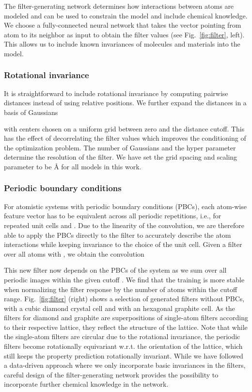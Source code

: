\documentclass[aip,jcp,reprint,graphicx]{revtex4-1}
\newcommand{\new}[1]{#1}
\begin{document}
The filter-generating network determines how interactions between atoms are modeled and can be used to constrain the model and include chemical knowledge.
We choose a fully-connected neural network that takes the vector pointing from atom  to its neighbor  as input to obtain the filter values  (see Fig.~\ref{fig:filter}, left).
This allows us to include known invariances of molecules and materials into the model.

\subsubsection{Rotational invariance}
It is straightforward to include rotational invariance by computing pairwise distances instead of using relative positions.
We further expand the distances in a basis of Gaussians

with centers  chosen on a uniform grid between zero and the distance cutoff.
This has the effect of decorrelating the filter values which improves the conditioning of the optimization problem.
The number of Gaussians and the hyper parameter  determine the resolution of the filter.
\new{We have set the grid spacing and scaling parameter  to be {\AA} for all models in this work.}

\subsubsection{Periodic boundary conditions}
For atomistic systems with periodic boundary conditions (PBCs), each atom-wise feature vector  has to be equivalent across all periodic repetitions, i.e.,  for repeated unit cells  and .
Due to the linearity of the convolution, we are therefore able to apply the PBCs directly to the filter to accurately describe the atom interactions while keeping invariance to the choice of the unit cell.
Given a filter  over all atoms with , we obtain the convolution

This new filter  now depends on the PBCs of the system as we sum over all periodic images within the given cutoff .
We find that the training is more stable when normalizing the filter response  by the number of atoms within the cutoff range.
Fig.~\ref{fig:filter} (right) shows a selection of generated filters without PBCs, with a cubic diamond crystal cell and with an hexagonal graphite cell.
As the filters for diamond and graphite are superpositions of single-atom filters according to their respective lattice, they reflect the structure of the lattice.
Note that while the single-atom filters are circular due to the rotational invariance, the periodic filters become rotationally equivariant w.r.t. the orientation of the lattice, which still keeps the property prediction rotationally invariant.
While we have followed a data-driven approach where we only incorporate basic invariances in the filters, careful design of the filter-generating network provides the possibility to incorporate further chemical knowledge in the network.
\end{document}
